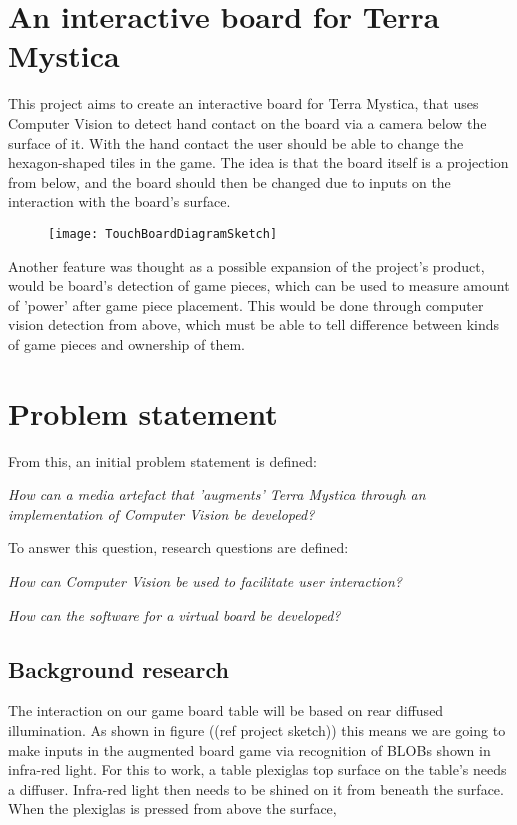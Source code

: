 \section{An interactive board for Terra Mystica}
This project aims to create an interactive board for Terra Mystica, that uses Computer Vision to detect hand contact on the board via a camera below the surface of it. With the hand contact the user should be able to change the hexagon-shaped tiles in the game. The idea is that the board itself is a projection from below, and the board should then be changed due to inputs on the interaction with the board's surface. 

\begin{figure}[!h]
\centering	\texttt{[image: TouchBoardDiagramSketch]}
\end{figure}

Another feature was thought as a possible expansion of the project's product, would be board's detection of game pieces, which can be used to measure amount of 'power' after game piece placement. This would be done through computer vision detection from above, which must be able to tell difference between kinds of game pieces and ownership of them.

\section{Problem statement}
From this, an initial problem statement is defined: 

\textit{How can a media artefact that 'augments' Terra Mystica through an implementation of Computer Vision be developed?}

To answer this question, research questions are defined:

\textit{How can Computer Vision be used to facilitate user interaction?}

\textit{How can the software for a virtual board be developed?}

\subsection{Background research}
The interaction on our game board table will be based on rear diffused illumination.\citep{multiTT} As shown in figure ((ref project sketch)) this means we are going to make inputs in the augmented board game via recognition of BLOBs shown in infra-red light. 
For this to work, a table plexiglas top surface on the table's needs a diffuser. Infra-red light then needs to be shined on it from beneath the surface. When the plexiglas is pressed from above the surface, 

